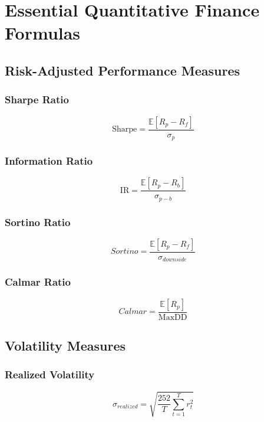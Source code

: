\documentclass[11pt,letterpaper]{book}
\newcommand{\E}{\mathbb{E}}
\newcommand{\IR}{\mathrm{IR}}
\newcommand{\Sharpe}{\mathrm{Sharpe}}
\newcommand{\MaxDD}{\mathrm{MaxDD}}
\begin{document}
\section{Essential Quantitative Finance Formulas}

\subsection{Risk-Adjusted Performance Measures}

\subsubsection{Sharpe Ratio}
\begin{equation}
\Sharpe = \frac{\E[R_p - R_f]}{\sigma_p}
\end{equation}

\subsubsection{Information Ratio}
\begin{equation}
\IR = \frac{\E[R_p - R_b]}{\sigma_{p-b}}
\end{equation}

\subsubsection{Sortino Ratio}
\begin{equation}
Sortino = \frac{\E[R_p - R_f]}{\sigma_{downside}}
\end{equation}

\subsubsection{Calmar Ratio}
\begin{equation}
Calmar = \frac{\E[R_p]}{\MaxDD}
\end{equation}

\subsection{Volatility Measures}

\subsubsection{Realized Volatility}
\begin{equation}
\sigma_{realized} = \sqrt{\frac{252}{T} \sum_{t=1}^T r_t^2}
\end{equation}
\end{document}
